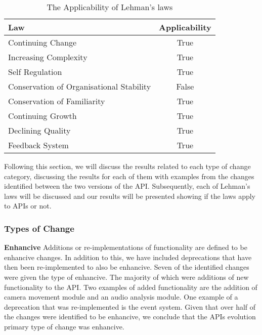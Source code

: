 \documentclass{sig-alternate}
\begin{document}
\begin{table}
       \centering
       \begin{tabular}[ht]{l|c}
              \toprule

              \textbf{Law}                              & \textbf{Applicability}    \\ \midrule
              Continuing Change                         & True                      \\ \hline
              Increasing Complexity                     & True                     \\ \hline
              Self Regulation                           & True                      \\ \hline
              Conservation of Organisational Stability  & False                     \\ \hline
              Conservation of Familiarity               & True                      \\ \hline
              Continuing Growth                         & True                      \\ \hline
              Declining Quality                         & True                     \\ \hline
              Feedback System                           & True                      \\ 

              \bottomrule

       \end{tabular}
       \caption{The Applicability of Lehman's laws}
       \label{table:lehman}
\end{table}

Following this section, we will discuss the results related to each type of change category, discussing the results for each of them with examples from the changes identified between the two versions of the API. Subsequently, each of Lehman's laws will be discussed and our results will be presented showing if the laws apply to APIs or not.





\subsubsection{Types of Change}

\smallskip \noindent
\textbf{Enhancive  }
Additions or re-implementations of functionality are defined to be enhancive changes. In addition to this, we have included deprecations that have then been re-implemented to also be enhancive.
Seven of the identified changes were given the type of enhancive. The majority of which were additions of new functionality to the API. Two examples of added functionality are the addition of camera movement module and an audio analysis module. One example of a deprecation that was re-implemented is the event system.
Given that over half of the changes were identified to be enhancive, we conclude that the APIs evolution primary type of change was enhancive. 
\end{document}

